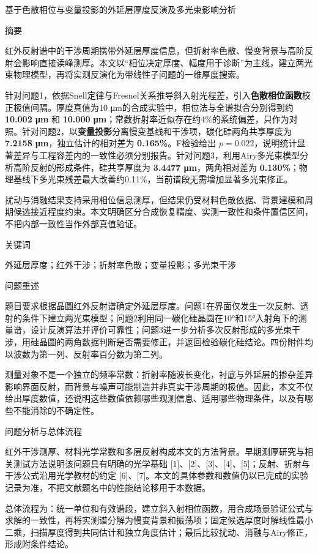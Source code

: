 基于色散相位与变量投影的外延层厚度反演及多光束影响分析

摘要

红外反射谱中的干涉周期携带外延层厚度信息，但折射率色散、慢变背景与高阶反射会影响直接读峰测厚。本文以``相位决定厚度、幅度用于诊断''为主线，建立两光束物理模型，再将实测反演化为带线性子问题的一维厚度搜索。

针对问题1，依据Snell定律与Fresnel关系推导斜入射光程差，引入\textbf{色散相位函数}校正极值间隔。厚度真值为10
μm的合成实验中，相位法与全谱拟合分别得到约 \textbf{10.002 μm} 和
\textbf{10.000
μm}；常数折射率近似存在约4\%的系统偏差，只作为对照。针对问题2，以\textbf{变量投影}分离慢变基线和干涉项，碳化硅两角共享厚度为
\textbf{7.2158 μm}，独立估计的相对差为 \textbf{0.165\%}。F检验给出
\(p=0.022\)，说明统计显著差异与工程容差内的一致性必须分别报告。针对问题3，利用Airy多光束模型分析高阶反射的形成条件，硅共享厚度为
\textbf{3.4477 μm}，两角相对差为
\textbf{0.130\%}；物理基线下多光束残差最大改善约0.11\%，当前谱段无需增加显著多光束修正。

扰动与消融结果支持采用相位信息测厚，但结果仍受材料色散依据、背景建模和周期候选接近程度约束。本文明确区分合成恢复精度、实测一致性和条件置信区间，不把内部一致性当作外部真值验证。

关键词

外延层厚度；红外干涉；折射率色散；变量投影；多光束干涉

问题重述

题目要求根据晶圆红外反射谱确定外延层厚度。问题1在界面仅发生一次反射、透射的条件下建立两光束模型；问题2利用同一碳化硅晶圆在10°和15°入射角下的测量谱，设计反演算法并评价可靠性；问题3进一步分析多次反射形成的多光束干涉，用硅晶圆的两角数据判断是否需要修正，并返回检验碳化硅结论。四份附件均以波数为第一列、反射率百分数为第二列。

测量对象不是一个独立的频率常数：折射率随波长变化，衬底与外延层的掺杂差异影响界面反射，而背景与噪声可能制造并非真实干涉周期的极值。因此，本文不仅给出厚度数值，还说明这些数值依赖哪些观测信息、适用哪些物理条件，以及有哪些不能消除的不确定性。

问题分析与总体流程

红外干涉测厚、材料光学常数和多层反射构成本文的方法背景。早期测厚研究与相关测试方法说明该问题具有明确的光学基础
{[}1{]}、{[}2{]}、{[}3{]}、{[}4{]}、{[}5{]}；反射、折射与干涉公式沿用光学教材的约定
{[}6{]}、{[}7{]}。本文的具体参数和数值仍以已完成的实验记录为准，不把文献题名中的性能结论移用于本数据。

总体流程为：统一单位和有效谱段，建立斜入射相位函数，用合成场景验证公式与求解的一致性，再将实测谱分解为慢变背景和振荡项；固定候选厚度时解线性最小二乘，扫描厚度得到共同估计和独立角度估计；最后比较扰动、消融与Airy修正，形成附条件结论。


